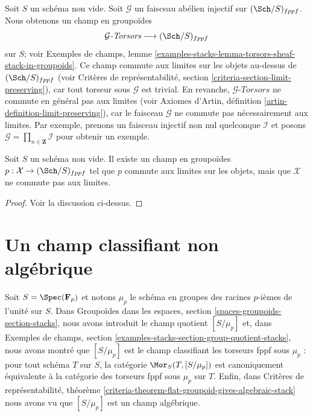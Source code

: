 \noindent
Soit $S$ un schéma non vide. Soit $\mathcal{G}$ un faisceau abélien injectif
sur $(\Sch/S)_{fppf}$. Nous obtenons un champ en groupoïdes
$$
\mathcal{G}\textit{-Torsors} \longrightarrow (\Sch/S)_{fppf}
$$
sur $S$; voir Exemples de champs, lemme
\ref{examples-stacks-lemma-torsors-sheaf-stack-in-groupoids}.
Ce champ commute aux limites sur les objets au-dessus de $(\Sch/S)_{fppf}$ (voir
Critères de représentabilité, section \ref{criteria-section-limit-preserving}),
car tout torseur sous $\mathcal{G}$ est trivial. En revanche,
$\mathcal{G}\textit{-Torsors}$ ne commute en général pas aux limites (voir
Axiomes d'Artin, définition \ref{artin-definition-limit-preserving}),
car le faisceau $\mathcal{G}$ ne commute pas nécessairement aux limites. Par exemple,
prenons un faisceau injectif non nul quelconque $\mathcal{I}$ et posons
$\mathcal{G} = \prod_{n \in \mathbf{Z}} \mathcal{I}$ pour obtenir un
exemple.

\begin{lemma}
\label{lemma-limit-preserving-on-objects-not-limit-preserving}
Soit $S$ un schéma non vide. Il existe un champ en groupoïdes
$p : \mathcal{X} \to (\Sch/S)_{fppf}$
tel que $p$ commute aux limites sur les objets, mais que $\mathcal{X}$ ne
commute pas aux limites.
\end{lemma}

\begin{proof}
Voir la discussion ci-dessus.
\end{proof}



\section{Un champ classifiant non algébrique}
\label{section-non-algebraic}

\noindent
Soit $S = \Spec(\mathbf{F}_p)$ et notons $\mu_p$ le
schéma en groupes des racines $p$-ièmes de l'unité sur $S$. Dans
Groupoïdes dans les espaces, section \ref{spaces-groupoids-section-stacks},
nous avons introduit le champ quotient $[S/\mu_p]$ et, dans
Exemples de champs, section \ref{examples-stacks-section-group-quotient-stacks},
nous avons montré que $[S/\mu_p]$ est le champ classifiant les
torseurs fppf sous $\mu_p$ : pour tout schéma $T$ sur $S$, la catégorie
$\Mor_S(T, [S/\mu_p])$ est canoniquement équivalente à la
catégorie des torseurs fppf sous $\mu_p$ sur $T$. Enfin, dans
Critères de représentabilité, théorème
\ref{criteria-theorem-flat-groupoid-gives-algebraic-stack}
nous avons vu que $[S/\mu_p]$ est un champ algébrique.

